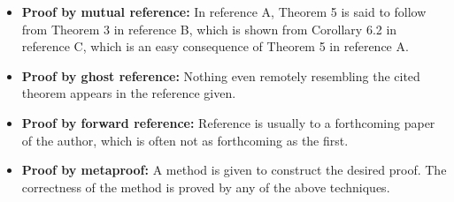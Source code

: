 \documentclass[twoside,12pt]{article}
\begin{document}
\begin{itemize}
\item {\bf Proof by mutual reference:} In reference A, Theorem 5 is
said to follow from Theorem 3 in reference B, which is shown from
Corollary 6.2 in reference C, which is an easy consequence of Theorem
5 in reference A.

\item {\bf Proof by ghost reference:} Nothing even remotely resembling
the cited theorem appears in the reference given.

\item {\bf Proof by forward reference:} Reference is usually to a
forthcoming paper of the author, which is often not as forthcoming as
the first.

\item {\bf Proof by metaproof:} A method is given to construct the
desired proof. The correctness of the method is proved by any of the
above techniques.

\end{itemize}
\end{document}
